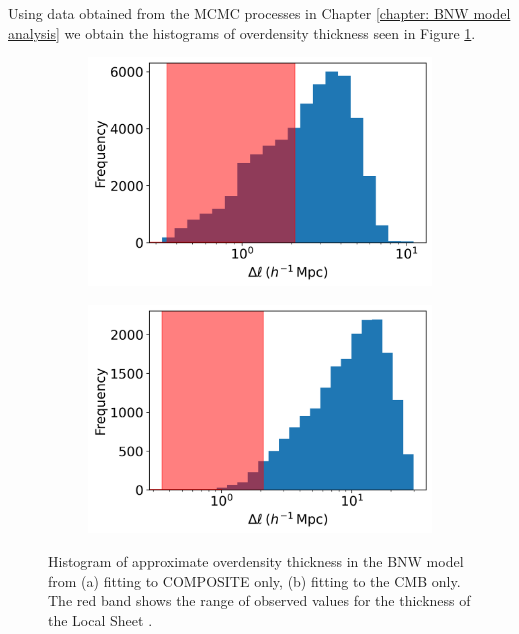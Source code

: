 \documentclass[a4paper,12pt]{report}
\begin{document}
\begin{appendices}
Using data obtained from the MCMC processes in Chapter \ref{chapter: BNW model analysis} we obtain the histograms of overdensity thickness seen in Figure \ref{fig: BNW model overdensity thickness appendix}.
\begin{figure}[t]
    \centering
    \begin{subfigure}{0.45\textwidth}
        \centering
        \includegraphics[width=\textwidth]{BNW Model MCMC/Distribution of overdensity thickness.png}
        \caption{}
    \end{subfigure}
    \begin{subfigure}{0.45\textwidth}
        \centering
        \includegraphics[width=\textwidth]{BNW Model MCMC/Distribution of overdensity thickness CMB.png}
        \caption{}
    \end{subfigure}
    \caption{Histogram of approximate overdensity thickness in the BNW model from (a) fitting to COMPOSITE only, (b) fitting to the CMB only. The red band shows the range of observed values for the thickness of the Local Sheet \cite{RN74,RN240}.}
    \label{fig: BNW model overdensity thickness appendix}
\end{figure}

\end{appendices}
\end{document}
